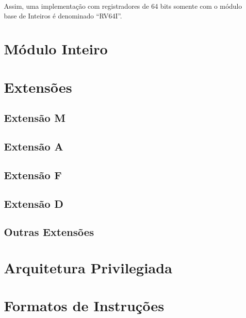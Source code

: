         {Assim, uma implementação com registradores de 64 bits somente com o módulo base de Inteiros é denominado ``RV64I''.}


        \section{Módulo Inteiro}

            {}


        \section{Extensões}

            \subsection{Extensão M}

                {}


            \subsection{Extensão A}

                {}


            \subsection{Extensão F}

                {}


            \subsection{Extensão D}

                {}


            \subsection{Outras Extensões}

                {}

    \section{Arquitetura Privilegiada}

        {}


    \section{Formatos de Instruções}


